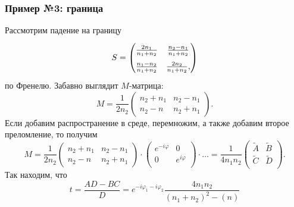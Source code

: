 \subsubsection*{Пример №3: граница}

Рассмотрим падение на границу
\begin{equation*}
    S = \begin{pmatrix}
    \vphantom{\dfrac{1}{2}}
        \frac{2n_1}{n_1 + n_2} & \frac{n_2-n_1}{n_1 + n_2} \\ 
    \vphantom{\dfrac{1}{2}}
        \frac{n_1-n_2}{n_1+n_2} & \frac{2 n_2}{n_1 + n_2},
    \end{pmatrix}
\end{equation*}
по Френелю. Забавно выглядит $M$-матрица:
\begin{equation*}
    M  = \frac{1}{2n_2} \begin{pmatrix}
        n_2 + n_1 & n_2-n_1 \\
        n_2-n & n_2 + n_1
    \end{pmatrix}.
\end{equation*}
Если добавим распространение в среде, перемножим, а также добавим второе преломление, то получим
\begin{equation*}
    M = \frac{1}{2n_2} \begin{pmatrix}
        n_2 + n_1 & n_2-n_1 \\
        n_2-n & n_2 + n_1
    \end{pmatrix} 
    \cdot 
    \begin{pmatrix}
        e^{- i \varphi} & 0 \\
        0 & e^{i \varphi} \\
    \end{pmatrix}
    \cdot \ldots
    = 
    \frac{1}{4n_1 n_2} \begin{pmatrix}
        \tilde{A} & \tilde{B} \\
        \tilde{C} & \tilde{D} \\
    \end{pmatrix}.
\end{equation*}
Так находим, что
\begin{equation*}
    t = \frac{AD - BC}{D} = e^{-i \varphi_1 - i \varphi_2} \frac{4 n_1 n_2}{(n_1+n_2)^2-(n)}
\end{equation*}